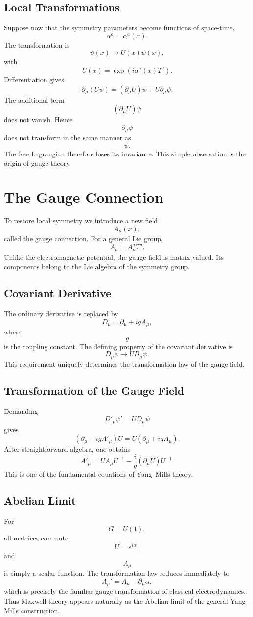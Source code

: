 \subsection{Local Transformations}
Suppose now that the symmetry parameters become functions of space-time,
\[\alpha^a=\alpha^a(x).\]
The transformation is
\[\boxed{\psi(x)\rightarrow U(x)\psi(x),}\]
with
\[U(x)=\exp(i\alpha^a(x)T^a).\]
Differentiation gives
\[\partial_\mu(U\psi)=(\partial_\mu U)\psi+U\partial_\mu\psi.\]
The additional term
\[(\partial_\mu U)\psi\]
does not vanish.
Hence
\[\partial_\mu\psi\]
does not transform in the same manner as
\[\psi.\]
The free Lagrangian therefore loses its invariance.
This simple observation is the origin of gauge theory.
\section{The Gauge Connection}
To restore local symmetry we introduce a new field
\[A_\mu(x),\]
called the gauge connection.
For a general Lie group,
\[\boxed{A_\mu=A_\mu^aT^a.}\]
Unlike the electromagnetic potential,
the gauge field is matrix-valued.
Its components belong to the Lie algebra of the symmetry group.
\subsection{Covariant Derivative}
The ordinary derivative is replaced by
\[\boxed{D_\mu=\partial_\mu+igA_\mu,}\]
where
\[g\]
is the coupling constant.
The defining property of the covariant derivative is
\[\boxed{D_\mu\psi\rightarrow UD_\mu\psi.}\]
This requirement uniquely determines the transformation law of the
gauge field.
\subsection{Transformation of the Gauge Field}
Demanding
\[D'_\mu\psi'=UD_\mu\psi\]
gives
\[(\partial_\mu+igA'_\mu)U=U(\partial_\mu+igA_\mu).\]
After straightforward algebra,
one obtains
\[\boxed{A'_\mu=UA_\mu U^{-1}-\frac{i}{g}(\partial_\mu U)U^{-1}.}\]
This is one of the fundamental equations of Yang--Mills theory.
\subsection{Abelian Limit}
For
\[G=U(1),\]
all matrices commute,
\[U=e^{i\alpha},\]
and
\[A_\mu\]
is simply a scalar function.
The transformation law reduces immediately to
\[\boxed{A_\mu'=A_\mu-\partial_\mu\alpha,}\]
which is precisely the familiar gauge transformation of classical
electrodynamics.
Thus Maxwell theory appears naturally as the Abelian limit of the
general Yang--Mills construction.
